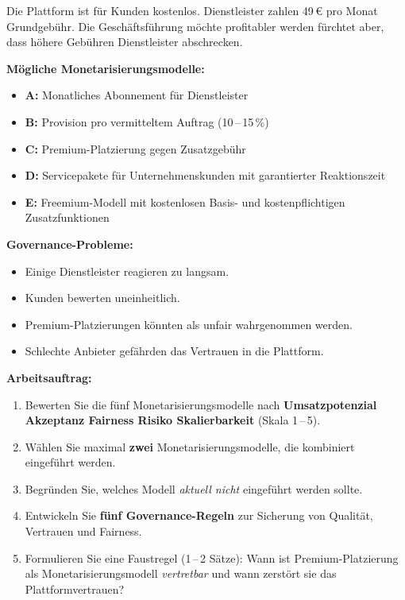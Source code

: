 \documentclass[11pt,a4paper,oneside]{article}
\begin{document}
\begin{infobox}
Die Plattform ist für Kunden kostenlos. Dienstleister zahlen 49\,\euro{} pro Monat Grundgebühr. Die Geschäftsführung möchte profitabler werden \textendash{} fürchtet aber, dass höhere Gebühren Dienstleister abschrecken.

\smallskip
\textbf{Mögliche Monetarisierungsmodelle:}
\begin{itemize}
  \item \textbf{A:} Monatliches Abonnement für Dienstleister
  \item \textbf{B:} Provision pro vermitteltem Auftrag (10\,--\,15\,\%)
  \item \textbf{C:} Premium-Platzierung gegen Zusatzgebühr
  \item \textbf{D:} Servicepakete für Unternehmenskunden mit garantierter Reaktionszeit
  \item \textbf{E:} Freemium-Modell mit kostenlosen Basis- und kostenpflichtigen Zusatzfunktionen
\end{itemize}

\smallskip
\textbf{Governance-Probleme:}
\begin{itemize}
  \item Einige Dienstleister reagieren zu langsam.
  \item Kunden bewerten uneinheitlich.
  \item Premium-Platzierungen könnten als unfair wahrgenommen werden.
  \item Schlechte Anbieter gefährden das Vertrauen in die Plattform.
\end{itemize}
\end{infobox}

\noindent\textbf{Arbeitsauftrag:}

\begin{enumerate}
  \item Bewerten Sie die fünf Monetarisierungsmodelle nach \textbf{Umsatzpotenzial \textperiodcentered{} Akzeptanz \textperiodcentered{} Fairness \textperiodcentered{} Risiko \textperiodcentered{} Skalierbarkeit} (Skala 1\,--\,5).
  \item Wählen Sie maximal \textbf{zwei} Monetarisierungsmodelle, die kombiniert eingeführt werden.
  \item Begründen Sie, welches Modell \emph{aktuell nicht} eingeführt werden sollte.
  \item Entwickeln Sie \textbf{fünf Governance-Regeln} zur Sicherung von Qualität, Vertrauen und Fairness.
  \item Formulieren Sie eine Faustregel (1\,--\,2 Sätze): Wann ist Premium-Platzierung als Monetarisierungsmodell \emph{vertretbar} \textendash{} und wann zerstört sie das Plattformvertrauen?
\end{enumerate}
\end{document}
